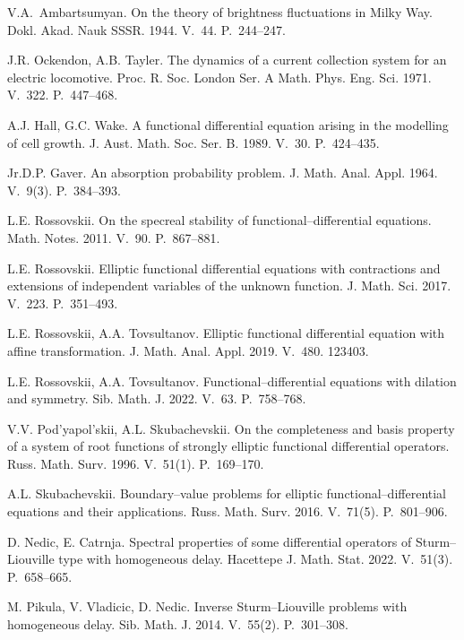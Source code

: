 \documentclass[11pt,centertags,reqno,twoside]{amsart}
\numberwithin{equation}{section}
\theoremstyle{definition}
\theoremstyle{remark}
\begin{document}
\begin{thebibliography}{}
V.A.~Ambartsumyan. On the theory of brightness fluctuations in Milky Way.
Dokl. Akad. Nauk SSSR. 1944. V.~44. P.~244--247.

J.R. Ockendon, A.B. Tayler. The dynamics of a current collection system for
an electric locomotive. Proc. R. Soc. London Ser. A Math. Phys. Eng. Sci. 1971.
V.~322. P.~447--468.

A.J. Hall, G.C. Wake. A functional differential equation arising in the
modelling of cell growth. J. Aust. Math. Soc. Ser. B. 1989. V.~30. P.~424--435.

Jr.D.P. Gaver. An absorption probability problem. J. Math. Anal. Appl. 1964. V.~9(3). P.~384--393.

L.E. Rossovskii. On the specreal stability of functional--differential equations.
Math. Notes. 2011. V.~90. P.~867--881.

L.E. Rossovskii. Elliptic functional differential equations with contractions and
extensions of independent variables of the unknown function. J. Math. Sci. 2017.
V.~223. P.~351--493.

L.E. Rossovskii, A.A. Tovsultanov. Elliptic functional differential equation with
affine transformation. J. Math. Anal. Appl. 2019. V.~480. 123403.

L.E. Rossovskii, A.A. Tovsultanov. Functional--differential equations with dilation
and symmetry. Sib. Math. J. 2022. V.~63. P.~758--768.

V.V. Pod'yapol'skii, A.L. Skubachevskii. On the completeness and basis property of
a system of root functions of strongly elliptic functional differential operators.
Russ. Math. Surv. 1996. V.~51(1). P.~169--170.

A.L. Skubachevskii. Boundary--value problems for elliptic functional--differential
equations and their applications. Russ. Math. Surv. 2016. V.~71(5). P.~801--906.

D. Nedic, E. Catrnja. Spectral properties of some differential operators of
Sturm--Liouville type with homogeneous delay. Hacettepe J. Math. Stat. 2022. V.~51(3). P.~658--665.

M. Pikula, V. Vladicic, D. Nedic. Inverse Sturm--Liouville problems with homogeneous
delay. Sib. Math. J. 2014. V.~55(2). P.~301--308.


\end{thebibliography}
\end{document}
